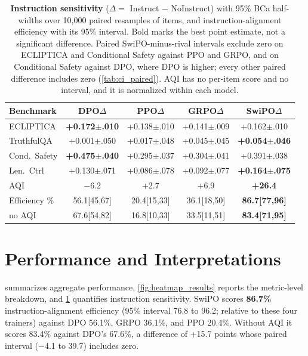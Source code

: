 \vspace{-1.5em}
\begin{table}[H]
\centering
\scriptsize
\setlength{\tabcolsep}{2pt}
\renewcommand{\arraystretch}{1.2}
\begin{tabular}{@{}lcccc@{}}
\toprule
\textbf{Benchmark} & \textbf{DPO$\Delta$} & \textbf{PPO$\Delta$} & \textbf{GRPO$\Delta$} & \textbf{SwiPO$\Delta$} \\
\midrule
ECLIPTICA & \textbf{+0.172{\tiny$\pm$.010}} & +0.138{\tiny$\pm$.010} & +0.141{\tiny$\pm$.009} & +0.162{\tiny$\pm$.010} \\ \hline
TruthfulQA & +0.001{\tiny$\pm$.050} & +0.017{\tiny$\pm$.048} & +0.045{\tiny$\pm$.045} & \textbf{+0.054{\tiny$\pm$.046}} \\ \hline
Cond.\ Safety & \textbf{+0.475{\tiny$\pm$.040}} & +0.295{\tiny$\pm$.037} & +0.304{\tiny$\pm$.041} & +0.391{\tiny$\pm$.038} \\ \hline
Len.\ Ctrl & +0.130{\tiny$\pm$.071} & +0.086{\tiny$\pm$.078} & +0.092{\tiny$\pm$.077} & \textbf{+0.164{\tiny$\pm$.075}} \\ \hline
AQI & $-$6.2 & +2.7 & +6.9 & \textbf{+26.4} \\
\midrule
Efficiency \% & 56.1{\tiny[45,67]} & 20.4{\tiny[15,33]} & 36.1{\tiny[18,50]} & \textbf{86.7{\tiny[77,96]}} \\
\quad no AQI & 67.6{\tiny[54,82]} & 16.8{\tiny[10,33]} & 33.5{\tiny[11,51]} & \textbf{83.4{\tiny[71,95]}} \\
\bottomrule
\end{tabular}
\vspace{-0.5em}
\caption{\textbf{Instruction sensitivity} (\(\Delta=\) Instruct $-$ NoInstruct) with 95\% BCa half-widths over 10,000 paired resamples of items, and instruction-alignment efficiency with its 95\% interval. Bold marks the best point estimate, not a significant difference. Paired SwiPO-minus-rival intervals exclude zero on ECLIPTICA and Conditional Safety against \textsc{PPO} and \textsc{GRPO}, and on Conditional Safety against \textsc{DPO}, where \textsc{DPO} is higher; every other paired difference includes zero (\cref{tab:ci_paired}). AQI has no per-item score and no interval, and it is normalized within each model.}
\label{tab:improvement_comparison}
\vspace{-3mm}
\end{table}

\vspace{-2mm}
\section*{Performance and Interpretations}
\label{sec:overall_results}
 summarizes aggregate performance, \cref{fig:heatmap_results} reports the metric-level breakdown, and \cref{tab:improvement_comparison} quantifies instruction sensitivity. SwiPO scores \textbf{86.7\%} instruction-alignment efficiency (95\% interval 76.8 to 96.2; relative to these four trainers) against \textsc{DPO} 56.1\%, \textsc{GRPO} 36.1\%, and \textsc{PPO} 20.4\%. Without AQI it scores 83.4\% against \textsc{DPO}'s 67.6\%, a difference of +15.7 points whose paired interval ($-$4.1 to 39.7) includes zero.

